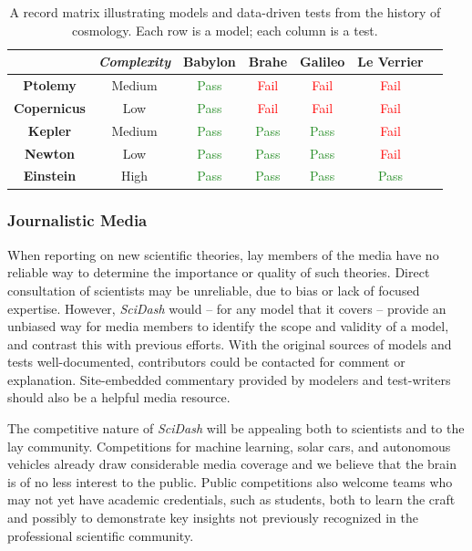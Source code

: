 \documentclass[11pt,letterpaper]{article}
\begin{document}
\begin{table}
\caption{A record matrix illustrating models and data-driven tests from the history of cosmology. Each row is a model; each column is a test.}
\label{table:record_matrix}
\begin{tabular}{| c | c | c | c | c | c | c }
\hline
		& \textit{Complexity} & \textbf{Babylon} & \textbf{Brahe} & \textbf{Galileo} & \textbf{Le Verrier} \\ \hline
	\textbf{Ptolemy} & Medium & \textcolor{ForestGreen}{Pass} & \textcolor{Red}{Fail} & \textcolor{Red}{Fail} & \textcolor{Red}{Fail} \\ \hline
	\textbf{Copernicus} & Low & \textcolor{ForestGreen}{Pass} & \textcolor{Red}{Fail} & \textcolor{Red}{Fail} & \textcolor{Red}{Fail} \\ \hline
	\textbf{Kepler} & Medium & \textcolor{ForestGreen}{Pass} & \textcolor{ForestGreen}{Pass} & \textcolor{ForestGreen}{Pass} & \textcolor{Red}{Fail} \\ \hline
	\textbf{Newton} & Low & \textcolor{ForestGreen}{Pass} & \textcolor{ForestGreen}{Pass} & \textcolor{ForestGreen}{Pass} & \textcolor{Red}{Fail} \\ \hline
	\textbf{Einstein} & High & \textcolor{ForestGreen}{Pass} & \textcolor{ForestGreen}{Pass} & \textcolor{ForestGreen}{Pass} & \textcolor{ForestGreen}{Pass} \\ \hline
\end{tabular}
\end{table}
\leavevmode

\subsubsection{Journalistic Media}
When reporting on new scientific theories, lay members of the media have no reliable way to determine the importance or quality of such theories.  Direct consultation of scientists may be unreliable, due to bias or lack of focused expertise.  However, \textit{SciDash} would -- for any model that it covers -- provide an unbiased way for media members to identify the scope and validity of a model, and contrast this with previous efforts.  With the original sources of models and tests well-documented, contributors could be contacted for comment or explanation.  Site-embedded commentary provided by modelers and test-writers should also be a helpful media resource.  

The competitive nature of \textit{SciDash} will be appealing both to scientists and to the lay community.  Competitions for machine learning, solar cars, and autonomous vehicles already draw considerable media coverage and we believe that the brain is of no less interest to the public.  Public competitions also welcome teams who may not yet have academic credentials, such as students, both to learn the craft and possibly to demonstrate key insights not previously recognized in the professional scientific community.  
\end{document}
